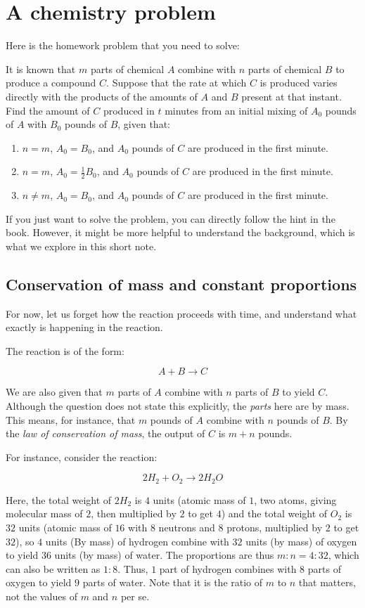 \documentclass{amsart}
\begin{document}
\section{A chemistry problem}

Here is the homework problem that you need to solve:

It is known that $m$ parts of chemical $A$ combine with $n$ parts of
chemical $B$ to produce a compound $C$. Suppose that the rate at which
$C$ is produced varies directly with the products of the amounts of
$A$ and $B$ present at that instant. Find the amount of $C$ produced
in $t$ minutes from an initial mixing of $A_0$ pounds of $A$ with
$B_0$ pounds of $B$, given that:

\begin{enumerate}
\item $n = m$, $A_0 = B_0$, and $A_0$ pounds of $C$ are produced in
  the first minute.
\item $n = m$, $A_0 = \frac{1}{2} B_0$, and $A_0$ pounds of $C$ are
  produced in the first minute.
\item $n \ne m$, $A_0 = B_0$, and $A_0$ pounds of $C$ are produced in
  the first minute.
\end{enumerate}

If you just want to solve the problem, you can directly follow the
hint in the book. However, it might be more helpful to understand the
background, which is what we explore in this short note.

\subsection{Conservation of mass and constant proportions}

For now, let us forget how the reaction proceeds with time, and
understand what exactly is happening in the reaction.

The reaction is of the form:

$$A + B \to C$$

We are also given that $m$ parts of $A$ combine with $n$ parts of $B$
to yield $C$. Although the question does not state this explicitly,
the {\em parts} here are by mass. This means, for instance, that $m$
pounds of $A$ combine with $n$ pounds of $B$. By the {\em law of
conservation of mass}, the output of $C$ is $m + n$ pounds.

For instance, consider the reaction:

$$2H_2 + O_2 \to 2H_2O$$

Here, the total weight of $2H_2$ is $4$ units (atomic mass of $1$, two
atoms, giving molecular mass of $2$, then multiplied by $2$ to get
$4$) and the total weight of $O_2$ is $32$ units (atomic mass of $16$
with $8$ neutrons and $8$ protons, multiplied by $2$ to get $32$), so
$4$ units (By mass) of hydrogen combine with $32$ units (by mass) of
oxygen to yield $36$ units (by mass) of water. The proportions are
thus $m:n = 4:32$, which can also be written as $1:8$. Thus, $1$ part
of hydrogen combines with $8$ parts of oxygen to yield $9$ parts of
water. Note that it is the ratio of $m$ to $n$ that matters, not the
values of $m$ and $n$ per se.
\end{document}
